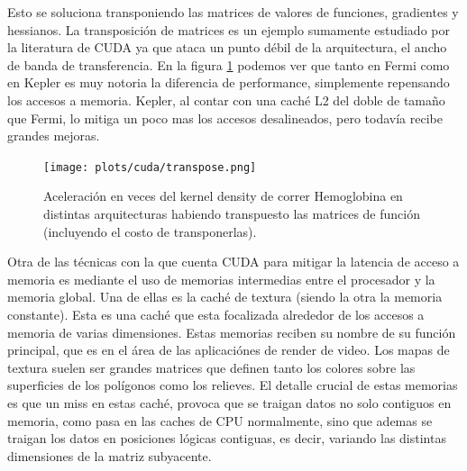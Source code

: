 Esto se soluciona transponiendo las matrices de valores de funciones, gradientes y hessianos.
La transposici\'on de matrices es un ejemplo sumamente estudiado por la literatura de CUDA
ya que ataca un punto d\'ebil de la arquitectura, el ancho de banda de transferencia. En la figura
\ref{fig:transpose} podemos ver que tanto en Fermi como en Kepler es muy notoria la diferencia
de performance, simplemente repensando los accesos a memoria. Kepler, al contar con una cach\'e L2
del doble de tama\~no que Fermi, lo mitiga un poco mas los accesos desalineados, pero todav\'ia recibe
grandes mejoras.


\begin{figure}[htbp]
   \centering
   \texttt{[image: plots/cuda/transpose.png]}
   \caption{Aceleraci\'on en veces del kernel density de correr Hemoglobina en distintas arquitecturas habiendo transpuesto las matrices
   de funci\'on (incluyendo el costo de transponerlas).}
   \label{fig:transpose}
\end{figure}

Otra de las t\'ecnicas con la que cuenta CUDA para mitigar la latencia de acceso a memoria
es mediante el uso de memorias intermedias entre el procesador y la memoria global. Una de ellas es
la cach\'e de textura (siendo la otra la memoria constante). Esta es una cach\'e que
esta focalizada alrededor de los accesos a memoria de varias dimensiones.
Estas memorias reciben su nombre de su funci\'on principal, que es en el \'area de las
aplicaci\'ones de render de video. Los mapas de textura suelen ser grandes matrices que definen
tanto los colores sobre las superficies de los pol\'igonos como los relieves.
El detalle crucial de estas memorias es que un miss en estas cach\'e, provoca
que se traigan datos no solo contiguos en memoria, como pasa en las caches de
CPU normalmente, sino que ademas se traigan los datos en posiciones l\'ogicas contiguas,
es decir, variando las distintas dimensiones de la matriz subyacente.

